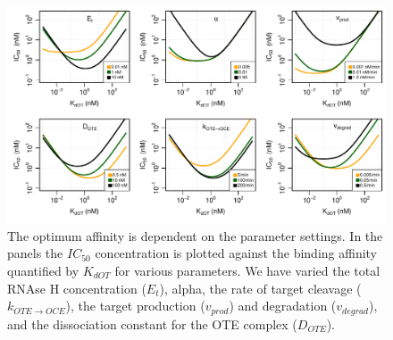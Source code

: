 \documentclass[a4paper,11pt]{article}
\newenvironment{Ncenter}{%
  \setlength\topsep{-10pt}
  \setlength\parskip{-100pt}
  \begin{center}
}{%
  \end{center}
}
\begin{document}
\begin{figure}[!h]
\begin{Ncenter}
\includegraphics[width=\textwidth]{SuppFile1-S2.pdf}
\end{Ncenter}
\caption{The optimum affinity is dependent on the parameter settings. In the panels the $IC_{50}$ concentration is plotted against the binding affinity quantified by $K_{dOT}$ for various parameters. We have varied the total RNAse H concentration ($E_t$), alpha, the rate of target cleavage ($k_{OTE \to OCE}$), the target production ($v_{prod}$) and degradation ($v_{degrad}$), and the dissociation constant for the OTE complex ($D_{OTE}$).}\label{fig::Opt}
\end{figure}
\end{document}
